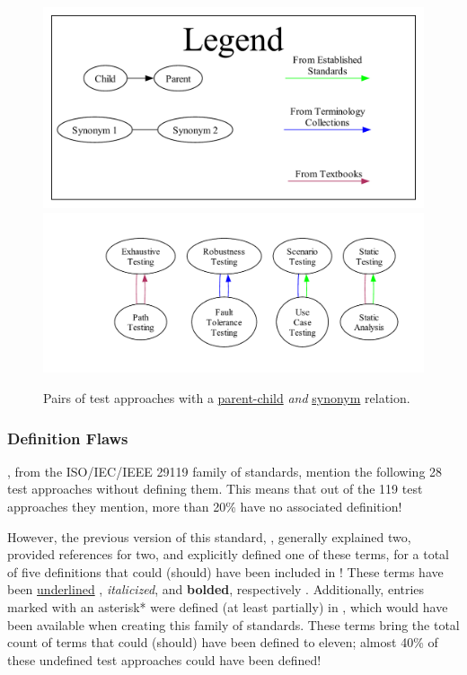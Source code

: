 \ifnotpaper
    \begin{figure}[bt!]
        \centering
        \includegraphics[width=0.48\linewidth]{assets/graphs/manual/expParSynLegend.pdf}
        \includegraphics[width=0.5\linewidth]{assets/graphs/manual/expParSynGraph.pdf}
        \caption{Pairs of test approaches with a \hyperref[par-chd-rels]{parent-child}
            \emph{and} \hyperref[syn-rels]{synonym} relation.}\label{fig:expParSynGraph}
    \end{figure}
\else
\fi

\ifnotpaper
    \subsubsection{Definition Flaws}\label{defs}

    \citet{IEEE2022, IEEE2021a, IEEE2021b, IEEE2021c}, from the
    ISO/IEC/IEEE 29119 family of standards, mention the following 28 test
    approaches without defining them. This means that out of the 119 test
    approaches they mention, more than 20\% have no associated definition!

    However, the previous version of this standard, \citeyearpar{IEEE2013},
    generally explained two, provided references for two, and explicitly defined
    one of these terms, for a total of five definitions that could (should) have
    been included in \citeyearpar{IEEE2022}! These terms have been
    \underline{underlined}\ifnotpaper%
        , \emph{italicized}, and \textbf{bolded}, respectively%
    \fi. Additionally, entries marked with an asterisk* were defined (at least
    partially) in \citeyearpar{IEEE2017}, which would have been available when
    creating this family of standards. These terms bring the total count of
    terms that could (should) have been defined to eleven; almost 40\% of
    these undefined test approaches could have been defined!

